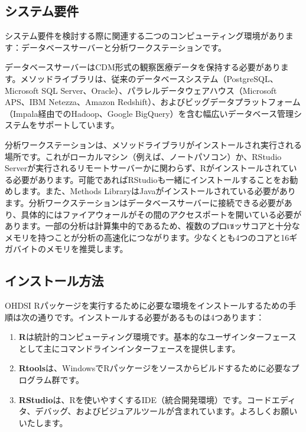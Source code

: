 \documentclass[
  11pt]{book}
\providecommand{\tightlist}{%
  \setlength{\itemsep}{0pt}\setlength{\parskip}{0pt}}
\theoremstyle{definition}
\theoremstyle{definition}
\theoremstyle{definition}
\theoremstyle{definition}
\theoremstyle{remark}
\begin{document}
\subsection{システム要件}\label{ux30b7ux30b9ux30c6ux30e0ux8981ux4ef6}

システム要件を検討する際に関連する二つのコンピューティング環境があります：データベースサーバーと分析ワークステーションです。 

データベースサーバーはCDM形式の観察医療データを保持する必要があります。メソッドライブラリは、従来のデータベースシステム（PostgreSQL、Microsoft SQL Server、Oracle）、パラレルデータウェアハウス（Microsoft APS、IBM Netezza、Amazon Redshift）、およびビッグデータプラットフォーム（Impala経由でのHadoop、Google BigQuery）を含む幅広いデータベース管理システムをサポートしています。

分析ワークステーションは、メソッドライブラリがインストールされ実行される場所です。これがローカルマシン（例えば、ノートパソコン）か、RStudio Serverが実行されるリモートサーバーかに関わらず、Rがインストールされている必要があります。可能であればRStudioも一緒にインストールすることをお勧めします。また、Methods LibraryはJavaがインストールされている必要があります。分析ワークステーションはデータベースサーバーに接続できる必要があり、具体的にはファイアウォールがその間のアクセスポートを開いている必要があります。一部の分析は計算集中的であるため、複数のプロเซッサコアと十分なメモリを持つことが分析の高速化につながります。少なくとも4つのコアと16ギガバイトのメモリを推奨します。

\subsection{インストール方法}\label{installR}

OHDSI Rパッケージを実行するために必要な環境をインストールするための手順は次の通りです。インストールする必要があるものは4つあります： 

\begin{enumerate}
\def\labelenumi{\arabic{enumi}.}
\tightlist
\item
  \textbf{R}は統計的コンピューティング環境です。基本的なユーザインターフェースとして主にコマンドラインインターフェースを提供します。
\item
  \textbf{Rtools}は、WindowsでRパッケージをソースからビルドするために必要なプログラム群です。
\item
  \textbf{RStudio}は、Rを使いやすくするIDE（統合開発環境）です。コードエディタ、デバッグ、およびビジュアルツールが含まれています。よろしくお願いいたします。
\end{enumerate}
\end{document}
